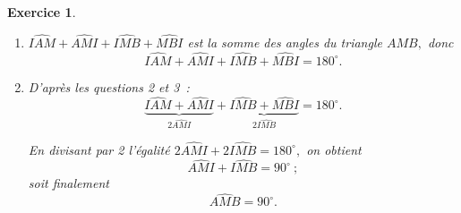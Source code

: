 \documentclass[10pt]{article}
\newtheorem{exo}{Exercice}
\begin{document}
\begin{exo}
\begin{enumerate}
La démonstration est la même pour les deux autres angles grâce au triangle $IBM~:$

 \[\widehat{IMB}=\widehat{MBI}.\]
\item $\widehat{IAM}+\widehat{AMI}+\widehat{IMB}+\widehat{MBI}$ est la somme des angles du triangle $AMB,$ donc \[\widehat{IAM}+\widehat{AMI}+\widehat{IMB}+\widehat{MBI}=180^{\circ}.\]
\item D'après les questions 2 et 3~:
\[\underbrace{\widehat{IAM}+\widehat{AMI}}_{2\widehat{AMI}}+\underbrace{\widehat{IMB}+\widehat{MBI}}_{2\widehat{IMB}}=180^{\circ}.\]

En divisant par 2 l'égalité $2\widehat{AMI}+2\widehat{IMB}=180^{\circ},$ on obtient
\[\widehat{AMI}+\widehat{IMB}=90^{\circ}~;\] soit finalement 
\[\widehat{AMB}=90^{\circ}.\]
\end{enumerate}

\end{exo}
\end{document}
